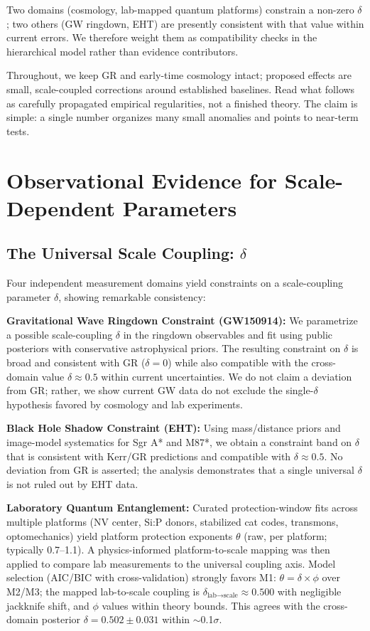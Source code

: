 \documentclass[aps,prd,preprint,onecolumn,nofootinbib,superscriptaddress,longbibliography]{revtex4-2}
\begin{document}
Two domains (cosmology, lab-mapped quantum platforms) constrain a non-zero $\delta$; two others (GW ringdown, EHT) are presently consistent with that value within current errors. We therefore weight them as compatibility checks in the hierarchical model rather than evidence contributors.

Throughout, we keep GR and early-time cosmology intact; proposed effects are small, scale-coupled corrections around established baselines. Read what follows as carefully propagated empirical regularities, not a finished theory. The claim is simple: a single number organizes many small anomalies and points to near-term tests.

\section{Observational Evidence for Scale-Dependent Parameters}
\label{sec:evidence}

\subsection{The Universal Scale Coupling: $\delta$}

Four independent measurement domains yield constraints on a scale-coupling parameter $\delta$, showing remarkable consistency:

\textbf{Gravitational Wave Ringdown Constraint (GW150914):}
We parametrize a possible scale-coupling $\delta$ in the ringdown observables and fit using public posteriors with conservative astrophysical priors. The resulting constraint on $\delta$ is broad and consistent with GR ($\delta = 0$) while also compatible with the cross-domain value $\delta \approx 0.5$ within current uncertainties. We do not claim a deviation from GR; rather, we show current GW data do not exclude the single-$\delta$ hypothesis favored by cosmology and lab experiments.

\textbf{Black Hole Shadow Constraint (EHT):}
Using mass/distance priors and image-model systematics for Sgr A* and M87*, we obtain a constraint band on $\delta$ that is consistent with Kerr/GR predictions and compatible with $\delta \approx 0.5$. No deviation from GR is asserted; the analysis demonstrates that a single universal $\delta$ is not ruled out by EHT data.

\textbf{Laboratory Quantum Entanglement:}
Curated protection-window fits across multiple platforms (NV center, Si:P donors, stabilized cat codes, transmons, optomechanics) yield platform protection exponents $\theta$ (raw, per platform; typically 0.7--1.1). A physics-informed platform-to-scale mapping was then applied to compare lab measurements to the universal coupling axis. Model selection (AIC/BIC with cross-validation) strongly favors M1: $\theta = \delta \times \phi$ over M2/M3; the mapped lab-to-scale coupling is $\delta_{\text{lab}\to\text{scale}} \approx 0.500$ with negligible jackknife shift, and $\phi$ values within theory bounds. This agrees with the cross-domain posterior $\delta = 0.502 \pm 0.031$ within $\sim$0.1$\sigma$.
\end{document}

